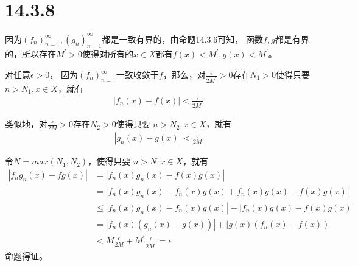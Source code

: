 \documentclass{article}
\begin{document}
\section*{14.3.8}

因为$(f_n)_{n = 1}^\infty, (g_n)_{n = 1}^\infty$都是一致有界的，由命题14.3.6可知，
函数$f, g$都是有界的，所以存在$M^\prime>0$使得对所有的$x \in X$都有$f(x) < M^\prime, g(x) < M^\prime$。

对任意$\epsilon > 0$，
因为$(f_n)_{n = 1}^\infty$一致收敛于$f$，那么，对$\frac{\epsilon}{2M^\prime} > 0$存在$N_1 > 0$使得只要
$n > N_1, x \in X$，就有
\begin{align*}
  |f_n(x) - f(x)| < \frac{\epsilon}{2M^\prime}
\end{align*}

类似地，对$\frac{\epsilon}{2M} > 0$存在$N_2 > 0$使得只要
$n > N_2, x \in X$，就有
\begin{align*}
  |g_n(x) - g(x)| < \frac{\epsilon}{2M}
\end{align*}

令$N = max(N_1, N_2)$，使得只要
$n > N, x \in X$，就有
\begin{align*}
  |f_ng_n(x) - fg(x)| & = |f_n(x)g_n(x) - f(x)g(x)|                                             \\
                      & = |f_n(x)g_n(x) - f_n(x)g(x) +  f_n(x)g(x)  - f(x)g(x)|                 \\
                      & \leq |f_n(x)g_n(x) - f_n(x)g(x)| + |f_n(x)g(x) - f(x)g(x)|              \\
                      & = |f_n(x)(g_n(x) - g(x))| + |g(x)(f_n(x) - f(x))|                       \\
                      & < M \frac{\epsilon}{2M} + M^\prime \frac{\epsilon}{2M^\prime} = \epsilon
\end{align*}
命题得证。
\end{document}
